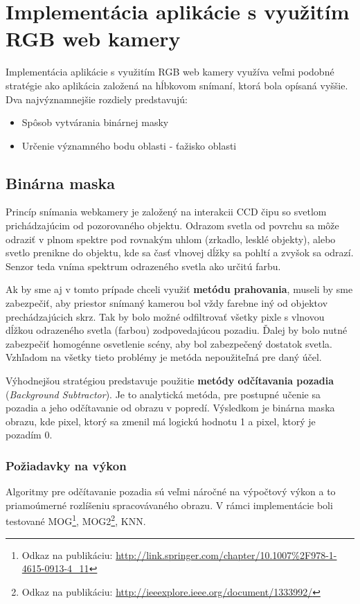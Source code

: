 \section{Implementácia aplikácie s využitím RGB web kamery}
Implementácia aplikácie s využitím RGB web kamery využíva veľmi podobné stratégie ako aplikácia založená na hĺbkovom snímaní, ktorá bola opísaná vyššie. Dva najvýznamnejšie rozdiely predstavujú:
\begin{itemize}
\item Spôsob vytvárania binárnej masky
\item Určenie významného bodu oblasti - ťažisko oblasti
\end{itemize}

\subsection{Binárna maska}
Princíp snímania webkamery je založený na interakcii CCD čipu  so svetlom prichádzajúcim od pozorovaného objektu. Odrazom svetla od povrchu sa môže odraziť v plnom spektre pod rovnakým uhlom (zrkadlo, lesklé objekty), alebo svetlo prenikne do objektu, kde sa časť vlnovej dĺžky sa pohltí a zvyšok sa odrazí. Senzor teda vníma spektrum odrazeného svetla ako určitú farbu.

Ak by sme aj v tomto prípade chceli využiť \textbf{metódu prahovania}, museli by sme zabezpečiť, aby priestor snímaný kamerou bol vždy farebne iný od objektov prechádzajúcich skrz. Tak by bolo možné odfiltrovať všetky pixle s vlnovou dĺžkou odrazeného svetla (farbou) zodpovedajúcou pozadiu. Ďalej by bolo nutné zabezpečiť homogénne osvetlenie scény, aby bol zabezpečený dostatok svetla. Vzhľadom na všetky tieto problémy je metóda nepoužiteľná pre daný účel.

Výhodnejšou stratégiou predstavuje použitie \textbf{metódy odčítavania pozadia} (\textit{Background Subtractor}). Je to analytická metóda, pre postupné učenie sa pozadia a jeho odčítavanie od obrazu v popredí. Výsledkom je binárna maska obrazu, kde pixel, ktorý sa zmenil má logickú hodnotu 1 a pixel, ktorý je pozadím 0. 

\subsubsection{Požiadavky na výkon}
Algoritmy pre odčítavanie pozadia sú veľmi náročné na výpočtový výkon a to priamoúmerné rozlíšeniu spracovávaného obrazu. V rámci implementácie boli testované MOG\footnote{Odkaz na publikáciu: \url{http://link.springer.com/chapter/10.1007\%2F978-1-4615-0913-4_11}}, MOG2\footnote{Odkaz na publikáciu: \url{http://ieeexplore.ieee.org/document/1333992/}}, KNN.

